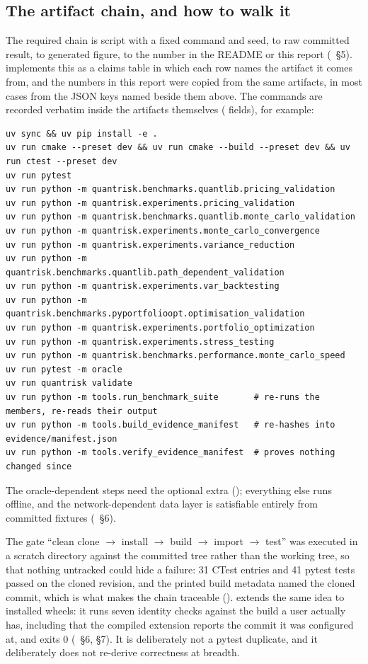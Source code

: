 \documentclass[11pt,a4paper]{article}
\begin{document}
\subsection{The artifact chain, and how to walk it}
The required chain is script with a fixed command and seed, to raw committed result, to
generated figure, to the number in the README or this report
(~\S5).  implements this as a claims table in
which each row names the artifact it comes from, and the numbers in this report were copied
from the same artifacts, in most cases from the JSON keys named beside them above. The commands
are recorded verbatim inside the artifacts themselves ( fields), for example:
{\scriptsize
\begin{verbatim}
uv sync && uv pip install -e .
uv run cmake --preset dev && uv run cmake --build --preset dev && uv run ctest --preset dev
uv run pytest
uv run python -m quantrisk.benchmarks.quantlib.pricing_validation
uv run python -m quantrisk.experiments.pricing_validation
uv run python -m quantrisk.benchmarks.quantlib.monte_carlo_validation
uv run python -m quantrisk.experiments.monte_carlo_convergence
uv run python -m quantrisk.experiments.variance_reduction
uv run python -m quantrisk.benchmarks.quantlib.path_dependent_validation
uv run python -m quantrisk.experiments.var_backtesting
uv run python -m quantrisk.benchmarks.pyportfolioopt.optimisation_validation
uv run python -m quantrisk.experiments.portfolio_optimization
uv run python -m quantrisk.experiments.stress_testing
uv run python -m quantrisk.benchmarks.performance.monte_carlo_speed
uv run pytest -m oracle
uv run quantrisk validate
uv run python -m tools.run_benchmark_suite       # re-runs the members, re-reads their output
uv run python -m tools.build_evidence_manifest   # re-hashes into evidence/manifest.json
uv run python -m tools.verify_evidence_manifest  # proves nothing changed since
\end{verbatim}
}
The oracle-dependent steps need the optional  extra
(); everything else runs offline, and the network-dependent data layer is
satisfiable entirely from committed fixtures (~\S6).

The gate ``clean clone $\rightarrow$ install $\rightarrow$ build $\rightarrow$ import
$\rightarrow$ test'' was executed in a scratch directory against the committed tree rather than
the working tree, so that nothing untracked could hide a failure: 31 CTest entries and 41
pytest tests passed on the cloned revision, and the printed build metadata named the cloned
commit, which is what makes the chain traceable
().  extends the
same idea to installed wheels: it runs seven identity checks against the build a user actually
has, including that the compiled extension reports the commit it was configured at, and exits 0
(~\S6, \S7). It is deliberately not a pytest
duplicate, and it deliberately does not re-derive correctness at breadth.
\end{document}
